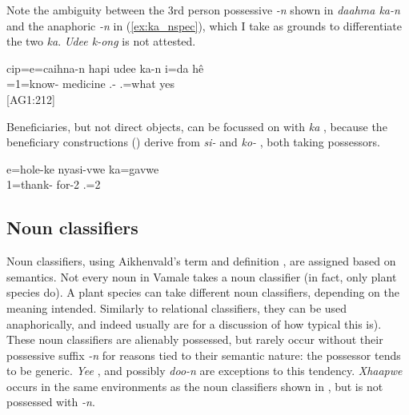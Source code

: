 Note the ambiguity between the 3rd person possessive \textit{-n} shown in \textit{daahma ka-n}  and the anaphoric \textit{-n} in (\ref{ex:ka_nspec}), which I take as grounds to differentiate the two \textit{ka}. \textit{Udee k-ong}  is not attested.

\ea \label{ex:ka_nspec}
\gll cip=e=caihna-n hapi udee ka-n i=da hê \\
 =1=know-  medicine .- .=what yes \\
\glt {} {[AG1:212]}
\z

Beneficiaries, but not direct objects, can be focussed on with \textit{ka} , because the beneficiary constructions () derive from \textit{si-}  and \textit{ko-} , both taking possessors. 

\ea \label{ex:ka gavwe}
\gll e=hole-ke nyasi-vwe ka=gavwe\\
 1=thank- for-2 .=2\\
\glt {}
\z

 
 \subsection{Noun classifiers}
 \label{ssec:NounCL}
 
 Noun classifiers, using Aikhenvald's term and definition \parencite[81]{aikhenvald_classifiers_2000}, are assigned based on semantics. Not every noun in Vamale takes a noun classifier (in fact, only plant species do). A plant species can take different noun classifiers, depending on the meaning intended. Similarly to relational classifiers, they can be used anaphorically, and indeed usually are \parencite[87]{aikhenvald_classifiers_2000} for a discussion of how typical this is). These noun classifiers are alienably possessed, but rarely occur without their possessive suffix \textit{-n} for reasons tied to their semantic nature: the possessor tends to be generic. \textit{Yee} , and possibly \textit{doo-n}  are exceptions to this tendency. \textit{Xhaapwe}  occurs in the same environments as the noun classifiers shown in , but is not possessed with \textit{-n}.
 
